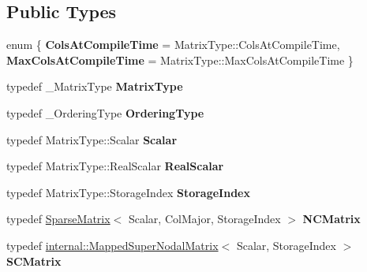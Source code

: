 \subsection*{Public Types}
\begin{DoxyCompactItemize}
\item 
\mbox{\label{class_eigen_1_1_sparse_l_u_ac7ae8094247aa83bd7f8170b6166233c}} 
enum \{ {\bfseries Cols\+At\+Compile\+Time} = Matrix\+Type\+::Cols\+At\+Compile\+Time, 
{\bfseries Max\+Cols\+At\+Compile\+Time} = Matrix\+Type\+::Max\+Cols\+At\+Compile\+Time
 \}
\item 
\mbox{\label{class_eigen_1_1_sparse_l_u_afde6955eb546fc127e96ad2c1fc087e2}} 
typedef \+\_\+\+Matrix\+Type {\bfseries Matrix\+Type}
\item 
\mbox{\label{class_eigen_1_1_sparse_l_u_a2e2e51e8f3e71a9fec516aaecef7b778}} 
typedef \+\_\+\+Ordering\+Type {\bfseries Ordering\+Type}
\item 
\mbox{\label{class_eigen_1_1_sparse_l_u_a105a0173a3e2ff548bc643c7c4f6c149}} 
typedef Matrix\+Type\+::\+Scalar {\bfseries Scalar}
\item 
\mbox{\label{class_eigen_1_1_sparse_l_u_a7569faba9d46aee2e8ffcf396bf09089}} 
typedef Matrix\+Type\+::\+Real\+Scalar {\bfseries Real\+Scalar}
\item 
\mbox{\label{class_eigen_1_1_sparse_l_u_a8111a1271e3ba9a4995ff78837d816f5}} 
typedef Matrix\+Type\+::\+Storage\+Index {\bfseries Storage\+Index}
\item 
\mbox{\label{class_eigen_1_1_sparse_l_u_af1fb9b86b237b26d2148df843bc41220}} 
typedef \mbox{\hyperlink{class_eigen_1_1_sparse_matrix}{Sparse\+Matrix}}$<$ Scalar, Col\+Major, Storage\+Index $>$ {\bfseries N\+C\+Matrix}
\item 
\mbox{\label{class_eigen_1_1_sparse_l_u_a1629a0610cbb03e5a4fa9b508ae4a4b6}} 
typedef \mbox{\hyperlink{class_eigen_1_1internal_1_1_mapped_super_nodal_matrix}{internal\+::\+Mapped\+Super\+Nodal\+Matrix}}$<$ Scalar, Storage\+Index $>$ {\bfseries S\+C\+Matrix}

\end{DoxyCompactItemize}
